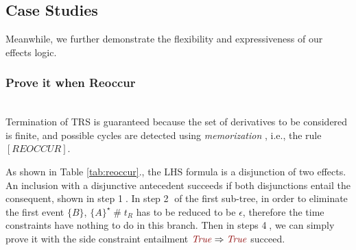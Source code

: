 \documentclass[acmsmall,10pt,review]{acmart}
\newcommand{\effect}{{\ensuremath{\mathrm{\Phi}}}}
\newcommand{\code}[1]{{\tt{\ensuremath{\m{#1}}}}}
\newcommand{\CONTAIN}{\sqsubseteq}
\newcommand{\m}{\mathit}
\newcommand{\mysharp}{{\mathrel{\texttt{\#}}}}
\newcommand\tabref[1]{Table \textcolor{black}{\ref{#1}}.}
\begin{document}
{\subsection{Case Studies}
\label{subsec:Case_Studies}

Meanwhile, we further demonstrate the flexibility and expressiveness of our effects logic. 










\subsubsection{Prove it when Reoccur}~\\

Termination of TRS is guaranteed because the set of derivatives to be considered is finite, and possible cycles are detected using \emph{memorization} \cite{DBLP:conf/tableaux/Brotherston05}, i.e., the rule \code{[REOCCUR]}. %






As shown in \tabref{tab:reoccur}, the LHS formula is a 
disjunction of two effects. An inclusion with a disjunctive 
antecedent succeeds if both disjunctions entail the consequent, 
shown in step {\textcircled{1}}.  
In step \textcircled{2} of the first sub-tree, in order to eliminate the first event \code{\{B\}}, \code{\{A\}^\star \mysharp  t_R} has to be reduced to be \code{\epsilon}, therefore the time constraints have nothing to do in this branch. 
Then in steps \textcircled{4}, we
can simply prove it with the side constraint entailment \code{\textcolor {darkred}{True} \Rightarrow  \textcolor {darkred}{True}} succeed.


}
\end{document}
